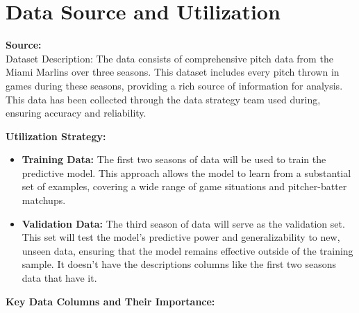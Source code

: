 \documentclass[12pt]{article}
\begin{document}
\maketitle

\section{Data Source and Utilization}

\textbf{Source:} \\
Dataset Description: The data consists of comprehensive pitch data from the Miami Marlins over three seasons. This dataset includes every pitch thrown in games during these seasons, providing a rich source of information for analysis. This data has been collected through the data strategy team used during, ensuring accuracy and reliability.

\textbf{Utilization Strategy:} \\
\begin{itemize}
    \item \textbf{Training Data:} The first two seasons of data will be used to train the predictive model. This approach allows the model to learn from a substantial set of examples, covering a wide range of game situations and pitcher-batter matchups.
    \item \textbf{Validation Data:} The third season of data will serve as the validation set. This set will test the model’s predictive power and generalizability to new, unseen data, ensuring that the model remains effective outside of the training sample. It doesn’t have the descriptions columns like the first two seasons data that have it.
\end{itemize}

\textbf{Key Data Columns and Their Importance:}
\end{document}
